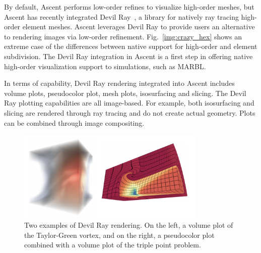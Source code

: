 By default, Ascent performs low-order refines to visualize high-order meshes,
but Ascent has recently integrated Devil Ray~\cite{dray}, a library for natively ray tracing
high-order element meshes.
%
Ascent leverages Devil Ray to provide users an alternative to rendering images via low-order refinement.
%
Fig.~\ref{img:crazy_hex} shows an extreme case of the differences between native support for high-order and element subdivision.
%
The Devil Ray integration in Ascent is a first step in offering native high-order
visualization support to simulations, such as MARBL.


In terms of capability, Devil Ray rendering integrated into Ascent includes
volume plots, pseudocolor plot, mesh plots, isosurfacing and slicing.
%
The Devil Ray plotting capabilities are all image-based.
%
For example, both isosurfacing and slicing are rendered through ray tracing and do not
create actual geometry.
%
Plots can be combined through image compositing.
%

\begin{figure}
\centering
\includegraphics[width=0.8\textwidth]{images/dray_combined}
\caption{\label{img:dray_plots}
Two examples of Devil Ray rendering. On the left, a volume plot of the
Taylor-Green vortex, and on the right, a pseudocolor plot combined with a
volume plot of the triple point problem.}
\end{figure}
